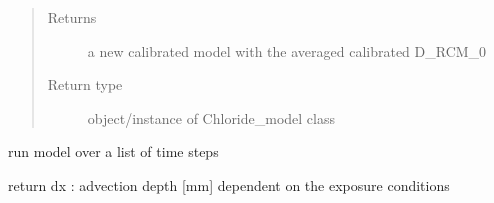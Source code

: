 \documentclass[letterpaper,10pt,english]{sphinxmanual}
\begin{document}
\begin{fulllineitems}
\begin{quote}
\begin{description}
\begin{itemize}
\end{itemize}

\item[{Returns}] \leavevmode
\sphinxAtStartPar
a new calibrated model with the averaged calibrated D\_RCM\_0

\item[{Return type}] \leavevmode
\sphinxAtStartPar
object/instance of Chloride\_model class

\end{description}\end{quote}

\end{fulllineitems}


\begin{fulllineitems}
\label{\detokenize{chloride:chloride.chloride_year}}
\sphinxAtStartPar
run model over a list of time steps

\end{fulllineitems}


\begin{fulllineitems}
\label{\detokenize{chloride:chloride.dx}}
\sphinxAtStartPar
return dx : advection depth {[}mm{]} dependent on the exposure conditions

\end{fulllineitems}

\end{document}
